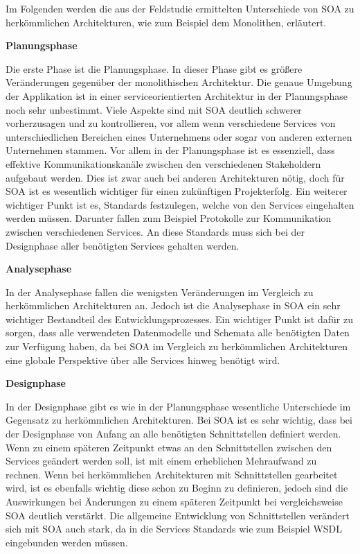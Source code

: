 Im Folgenden werden die aus der Feldstudie ermittelten Unterschiede von SOA zu herkömmlichen Architekturen, wie zum Beispiel dem Monolithen, erläutert. 


\textbf{Planungsphase}

Die erste Phase ist die Planungsphase. In dieser Phase gibt es größere Veränderungen gegenüber der monolithischen Architektur. Die genaue Umgebung der Applikation ist in einer serviceorientierten Architektur in der Planungsphase noch sehr unbestimmt. Viele Aspekte sind mit SOA deutlich schwerer vorherzusagen und zu kontrollieren, vor allem wenn verschiedene Services von unterschiedlichen Bereichen eines Unternehmens oder sogar von anderen externen Unternehmen stammen. Vor allem in der Planungsphase ist es essenziell, dass effektive Kommunikationskanäle zwischen den verschiedenen Stakeholdern aufgebaut werden. Dies ist zwar auch bei anderen Architekturen nötig, doch für SOA ist es wesentlich wichtiger für einen zukünftigen Projekterfolg. Ein weiterer wichtiger Punkt ist es, Standards festzulegen, welche von den Services eingehalten werden müssen. Darunter fallen zum Beispiel Protokolle zur Kommunikation zwischen verschiedenen Services. An diese Standards muss sich bei der Designphase aller benötigten Services gehalten werden. \cite{Haines.2010}


\textbf{Analysephase}

In der Analysephase fallen die wenigsten Veränderungen im Vergleich zu herkömmlichen Architekturen an. Jedoch ist die Analysephase in SOA ein sehr wichtiger Bestandteil des Entwicklungsprozesses. Ein wichtiger Punkt ist dafür zu sorgen, dass alle verwendeten Datenmodelle und Schemata alle benötigten Daten zur Verfügung haben, da bei SOA im Vergleich zu herkömmlichen Architekturen eine globale Perspektive über alle Services hinweg benötigt wird. \cite{Haines.2010}


\textbf{Designphase}

In der Designphase gibt es wie in der Planungsphase wesentliche Unterschiede im Gegensatz zu herkömmlichen Architekturen. Bei SOA ist es sehr wichtig, dass bei der Designphase von Anfang an alle benötigten Schnittstellen definiert werden. Wenn zu einem späteren Zeitpunkt etwas an den Schnittstellen zwischen den Services geändert werden soll, ist mit einem erheblichen Mehraufwand zu rechnen. Wenn bei herkömmlichen Architekturen mit Schnittstellen gearbeitet wird, ist es ebenfalls wichtig diese schon zu Beginn zu definieren, jedoch sind die Auswirkungen bei Änderungen zu einem späteren Zeitpunkt bei vergleichsweise SOA deutlich verstärkt. Die allgemeine Entwicklung von Schnittstellen verändert sich mit SOA auch stark, da in die Services Standards wie zum Beispiel WSDL eingebunden werden müssen. \cite{Haines.2010}

